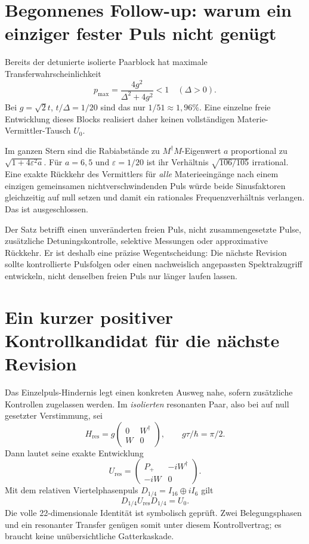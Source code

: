 \section{Begonnenes Follow-up: warum ein einziger fester Puls nicht genügt}
Bereits der detunierte isolierte Paarblock hat maximale Transferwahrscheinlichkeit
\begin{equation}
p_{\max}=\frac{4g^2}{\Delta^2+4g^2}<1\quad(\Delta>0).
\end{equation}
Bei $g=\sqrt2t$, $t/\Delta=1/20$ sind das nur $1/51\approx1{,}96\%$. Eine einzelne freie Entwicklung dieses Blocks realisiert daher keinen vollständigen Materie-Vermittler-Tausch $U_0$.

Im ganzen Stern sind die Rabiabstände zu $M^\dagger M$-Eigenwert $a$ proportional zu $\sqrt{1+4\varepsilon^2a}$. Für $a=6,5$ und $\varepsilon=1/20$ ist ihr Verhältnis $\sqrt{106/105}$ irrational. Eine exakte Rückkehr des Vermittlers für \emph{alle} Materieeingänge nach einem einzigen gemeinsamen nichtverschwindenden Puls würde beide Sinusfaktoren gleichzeitig auf null setzen und damit ein rationales Frequenzverhältnis verlangen. Das ist ausgeschlossen.

Der Satz betrifft einen unveränderten freien Puls, nicht zusammengesetzte Pulse, zusätzliche Detuningskontrolle, selektive Messungen oder approximative Rückkehr. Er ist deshalb eine präzise Wegentscheidung: Die nächste Revision sollte kontrollierte Pulsfolgen oder einen nachweislich angepassten Spektralzugriff entwickeln, nicht denselben freien Puls nur länger laufen lassen.

\section{Ein kurzer positiver Kontrollkandidat für die nächste Revision}
Das Einzelpuls-Hindernis legt einen konkreten Ausweg nahe, sofern zusätzliche Kontrollen zugelassen werden. Im \emph{isolierten} resonanten Paar, also bei auf null gesetzter Verstimmung, sei
\begin{equation}
H_{\mathrm{res}}=g\begin{pmatrix}0&W^\dagger\\W&0\end{pmatrix},
\qquad g\tau/\hbar=\pi/2.
\end{equation}
Dann lautet seine exakte Entwicklung
\begin{equation}
U_{\mathrm{res}}=
\begin{pmatrix}P_+&-iW^\dagger\\-iW&0\end{pmatrix}.
\end{equation}
Mit dem relativen Viertelphasenpuls $D_{1/4}=I_{16}\oplus iI_6$ gilt
\begin{equation}
\boxed{D_{1/4}U_{\mathrm{res}}D_{1/4}=U_0.}
\end{equation}
Die volle 22-dimensionale Identität ist symbolisch geprüft. Zwei Belegungsphasen und ein resonanter Transfer genügen somit unter diesem Kontrollvertrag; es braucht keine unübersichtliche Gatterkaskade.

